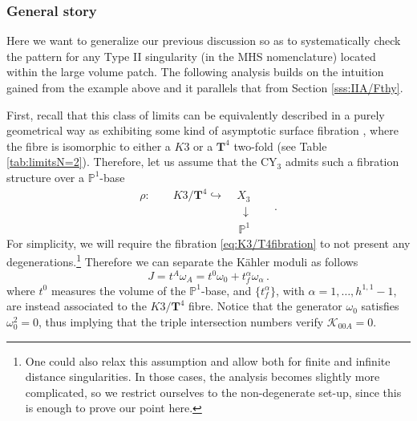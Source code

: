 \subsubsection{General story}
\label{sss:IIA/heterotic}	
	
	
Here we want to generalize our previous discussion so as to systematically check the pattern for any Type II singularity (in the MHS nomenclature) located within the large volume patch. The following analysis builds on the intuition gained from the example above and it parallels that from Section \ref{sss:IIA/Fthy}.   
	
First, recall that this class of limits can be equivalently described in a purely geometrical way as exhibiting some kind of asymptotic surface fibration \cite{doran2016mirror}, where the fibre is isomorphic to either a $K3$ or a $\mathbf{T}^4$ two-fold (see Table \ref{tab:limitsN=2}). Therefore, let us assume that the CY$_3$ admits such a fibration structure over a $\mathbb{P}^1$-base 
%
\begin{equation}\label{eq:K3/T4fibration}
			\begin{aligned}
				\rho: \qquad K3/\mathbf{T}^4 \hookrightarrow &\;X_{3} \\
				&\;\; \downarrow \qquad . \\ &\ \ \mathbb{P}^1
			\end{aligned}
\end{equation}
%
For simplicity, we will require the fibration \eqref{eq:K3/T4fibration} to not present any degenerations.\footnote{One could also relax this assumption and allow both for finite and infinite distance singularities. In those cases, the analysis becomes slightly more complicated, so we restrict ourselves to the non-degenerate set-up, since this is enough to prove our point here.} Therefore we can separate the K\"ahler moduli as follows
%
\begin{equation}\label{eq:Kahlermoduliemergentstring}
	J= t^A \omega_A = t^0 \omega_0 + t_f^{\alpha} \omega_{\alpha} \, . 
\end{equation}
%
where $t^0$ measures the volume of the $\mathbb{P}^1$-base, and $\lbrace t^{\alpha}_f\rbrace$, with $\alpha= 1, \ldots, h^{1,1}-1$, are instead associated to the $K3/\mathbf{T}^4$ fibre.  Notice that the generator $\omega_0$ satisfies $\omega_0^2=0$, thus implying that the triple intersection numbers verify $\mathcal{K}_{00 A}=0$.

